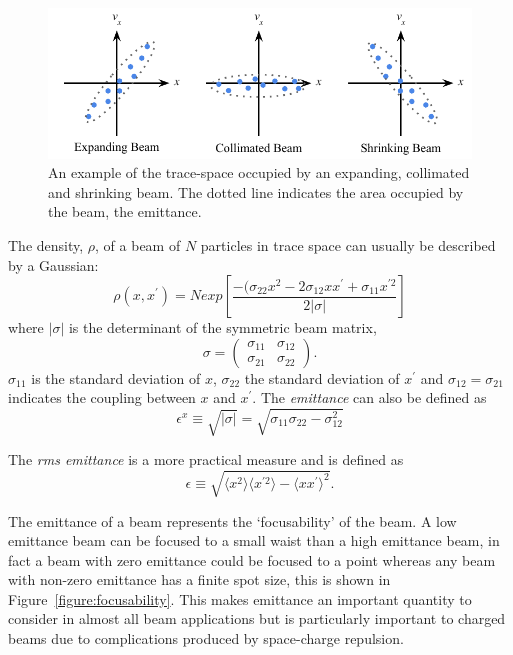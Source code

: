 \begin{figure}
\center
\includegraphics{part2/Figs/EmittanceExample.pdf}
\caption{An example of the trace-space occupied by an expanding, collimated and shrinking beam. The dotted line indicates the area occupied by the beam, the emittance.}
\label{figure:emittance_example}
\end{figure}

The density, $\rho$, of a beam of $N$ particles in trace space can usually be described by a Gaussian:
\begin{equation}\label{trace_space_density}
\rho(x, x^\prime) = N exp\left[ \frac{-(\sigma_{22}x^2-2\sigma_{12}xx^\prime+\sigma_{11}x^{\prime2}}{2|\sigma|} \right]
\end{equation}
where $|\sigma|$ is the determinant of the symmetric beam matrix,
\begin{equation}
\sigma = \begin{pmatrix} \sigma_{11} & \sigma_{12} \\ \sigma_{21} & \sigma_{22} \end{pmatrix}.
\end{equation}
$\sigma_{11}$ is the standard deviation of $x$, $\sigma_{22}$ the standard deviation of $x^\prime$ and $\sigma_{12}=\sigma_{21}$ indicates the coupling between $x$ and $x^\prime$. The \emph{emittance} can also be defined as
\begin{equation}\label{eq:emittancewithdeterminant}
\epsilon^x \equiv \sqrt{|\sigma|} = \sqrt{\sigma_{11}\sigma_{22}-\sigma_{12}^2}
\end{equation}

The \emph{\gls{rms} emittance} is a more practical measure and is defined as
\begin{equation}\label{emittance}
\epsilon \equiv \sqrt{\langle x^2\rangle \langle x^{\prime 2}\rangle - \langle x x^\prime\rangle^2}.
\end{equation}

The emittance of a beam represents the `focusability' of the beam.
A low emittance beam can be focused to a small waist than a high emittance beam, in fact a beam with zero emittance could be focused to a point whereas any beam with non-zero emittance has a finite spot size, this is shown in Figure~\ref{figure:focusability}.
This makes emittance an important quantity to consider in almost all beam applications but is particularly important to charged beams due to complications produced by space-charge repulsion.

